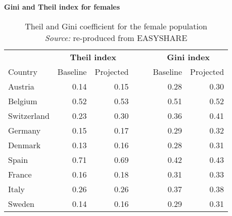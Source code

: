 \begin{table}[H]
    \centering \textbf{Gini and Theil index for females}\par\medskip\medskip
\begin{tabular}{lrrrrrr}
\midrule
 &    \multicolumn{2}{c}{\textbf{Theil index}}  & &&   \multicolumn{2}{c}{\textbf{Gini index}}  \\
Country &  Baseline &  Projected & && Baseline &  Projected \\
\toprule
      Austria &          0.14 &       0.15  && &          0.28 &       0.30  \\
      Belgium &           0.52 &       0.53  &  &  &        0.51 &       0.52 \\
  Switzerland &             0.23 &       0.30 &  & &        0.36 &       0.41  \\
      Germany &           0.15 &       0.17 &  &  &      0.29 &       0.32 \\
     Denmark &          0.13 &       0.16  &   &   &     0.28 &       0.31 \\
       Spain &           0.71 &       0.69 &  &     &    0.42 &       0.43  \\
      France &           0.16 &       0.18 &  &      &   0.31 &       0.33 \\
       Italy &           0.26 &       0.26 &  &       &   0.37 &       0.38\\
      Sweden &            0.14 &       0.16  &  &       & 0.29 &       0.31  \\
\bottomrule
\end{tabular}
\captionsetup{justification=centering}
 \caption{Theil and Gini coefficient for the female population\\ 
 \textit{Source:} re-produced from EASYSHARE }
    \label{tab:ginitheil_female}
\end{table}







